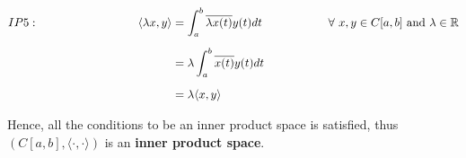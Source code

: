 \documentclass[12pt, a4paper]{article} %
\begin{document}
    \begin{equation*}
        \begin{split}
            IP5:\hspace*{3cm} \langle \lambda x, y \rangle & = \int_{a}^{b} \overline{\lambda x(t)} y(t) dt \hspace*{2cm} \forall\ x,y\in C[a,b]\ \mbox{and}\ \lambda \in \mathbb{R}\\[2mm]
            & = \lambda \int_{a}^{b} \overline{x(t)} y(t) dt\\[2mm]
            & = \lambda \langle x, y \rangle
        \end{split}
    \end{equation*}

    \vspace*{0.2cm}

    Hence, all the conditions to be an inner product space is satisfied, thus $\left(C[a,b],\langle \cdot, \cdot \rangle \right)$ is an {\bf inner product space}.

    \vspace*{0.5cm}






\end{document}
